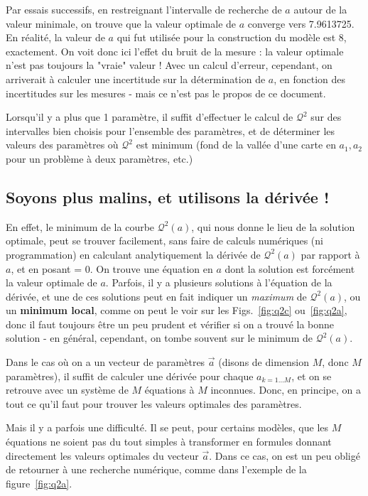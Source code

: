 \documentclass[main.tex]{subfiles}
\begin{document}
Par essais successifs, en restreignant l'intervalle de recherche de $a$ autour de la valeur minimale, on trouve que la valeur optimale de $a$ converge vers 7.9613725. En réalité, la valeur de $a$ qui fut utilisée pour la construction du modèle est 8, exactement. On voit donc ici l'effet du bruit de la mesure : la valeur optimale n'est pas toujours la "vraie" valeur ! Avec un calcul d'erreur, cependant, on arriverait à calculer une incertitude sur la détermination de $a$, en fonction des incertitudes sur les mesures - mais ce n'est pas le propos de ce document.

Lorsqu'il y a plus que 1 paramètre, il suffit d'effectuer le calcul de $\mathcal{Q}^2$ sur des intervalles bien choisis pour l'ensemble des paramètres, et de déterminer les valeurs des paramètres où $\mathcal{Q}^2$ est minimum (fond de la vallée d'une carte en $a_1,a_2$ pour un problème à deux paramètres, etc.)

\subsection{Soyons plus malins, et utilisons la dérivée !}

En effet, le minimum de la courbe $\mathcal{Q}^2(a)$, qui nous donne le lieu de la solution optimale, peut se trouver facilement, sans faire de calculs numériques (ni programmation) en calculant analytiquement la dérivée de $\mathcal{Q}^2(a)$ par rapport à $a$, et en posant = 0. On trouve une équation en $a$ dont la solution est forcément la valeur optimale de $a$. Parfois, il y a plusieurs solutions à l'équation de la dérivée, et une de ces solutions peut en fait indiquer un \textit{maximum} de $\mathcal{Q}^2(a)$, ou un \textbf{minimum local}, comme on peut le voir sur les Figs.~\ref{fig:q2c} ou~\ref{fig:q2a}, donc il faut toujours être un peu prudent et vérifier si on a trouvé la bonne solution - en général, cependant, on tombe souvent sur le minimum de $\mathcal{Q}^2(a)$.

Dans le cas où on a un vecteur de paramètres $\vec{a}$ (disons de dimension $M$, donc $M$ paramètres), il suffit de calculer une dérivée pour chaque $a_{k=1\dots M}$, et on se retrouve avec un système de $M$ équations à $M$ inconnues. Donc, en principe, on a tout ce qu'il faut pour trouver les valeurs optimales des paramètres.

Mais il y a parfois une difficulté. Il se peut, pour certains modèles, que les $M$ équations ne soient pas du tout simples à transformer en formules donnant directement les valeurs optimales du vecteur $\vec{a}$. Dans ce cas, on est un peu obligé de retourner à une recherche numérique, comme dans l'exemple de la figure~\ref{fig:q2a}.
\end{document}
